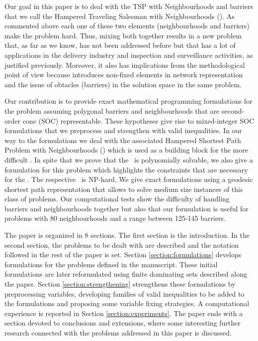 \documentclass[a4paper,  review, authoryear, 1p.]{elsarticle}
\newcommand{\SPPN}{{\sf{H-SPPN}\xspace }}
\newcommand{\TSPN}{{\sf{H-TSPN}\xspace }}
\begin{document}
		Our goal  in this paper is to deal with the TSP with Neighbourhoods and barriers that we call the Hampered Traveling Salesman with Neighbourhoods (\TSPN ). As commented above each one of these two elements (neighbourhoods and barriers) make the problem hard. Thus, mixing both together results in a new problem that, as far as we know, has not been addressed before but that has a lot of applications in the delivery industry and inspection and surveillance activities, as justified previously. Moreover, it also has implications from the methodological point of view because introduces non-fixed elements in network representation and the issue of obtacles (barriers) in the solution space in the same problem.
		
		Our contribution is to provide exact mathematical programming formulations for the problem assuming polygonal barriers and neighbourhoods that are second-order cone (SOC) representable. These hypotheses give rise to mixed-integer SOC formulations that we preprocess and strengthen with valid inequalities. In our way to the formulations we deal with the associated Hampered Shortest Path Problem with Neighbourhoods (\SPPN ) which is used as a building block for the more difficult \TSPN . In spite that we prove that the \SPPN \ is polynomially solvable, we also give a formulation for this problem which highlights the constraints that are necessary for the \TSPN. The respective \TSPN \ is NP-hard. We give exact formulations using a geodesic shortest path representation that allows to solve medium size instances of this class of problems. Our computational tests show the difficulty of handling barriers and neighbourhoods together  but also that our formulation is useful for problems with 80 neighbourhoods and a range between 125-145 barriers.
		
	
		The paper is organized in 8 sections. The first section is the introduction. In the second section, the problems to be dealt with are described and the notation followed in the rest of the paper is set. Section \ref{section:formulations} develops formulations for the problems defined in the manuscript. These initial formulations are later reformulated using finite dominating sets described along the paper.
		Section \ref{section:strengthening}  strengthens these formulations  by preprocessing variables, developing  families of  valid inequalities to be added to the formulations and proposing some variable fixing strategies. A computational experience is reported in Section \ref{section:experiments}. The paper ends with a section devoted to conclusions and extensions, where some interesting further research connected with the problems addressed in this paper is discussed.
		
\end{document}
